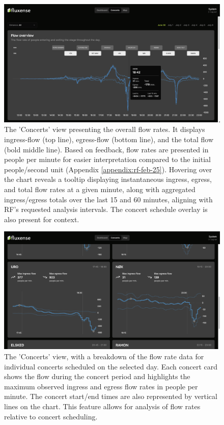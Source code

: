 \begin{figure}[H]
  \centering
  \includegraphics[width=\textwidth]{Pictures/Misc/Frontend/flow_total.png}
  \caption{The 'Concerts' view presenting the overall flow rates. It displays ingress-flow (top line), egress-flow (bottom line), and the total flow (bold middle line). Based on feedback, flow rates are presented in people per minute for easier interpretation compared to the initial people/second unit (Appendix \ref{appendix:rf-feb-25}). Hovering over the chart reveals a tooltip displaying instantaneous ingress, egress, and total flow rates at a given minute, along with aggregated ingress/egress totals over the last 15 and 60 minutes, aligning with RF's requested analysis intervals. The concert schedule overlay is also present for context.}
  \label{fig:showcase:flow-total}

\end{figure}

\begin{figure}[H]
  \centering
  \includegraphics[width=\textwidth]{Pictures/Misc/Frontend/flow_concerts.png}
  \caption{The 'Concerts' view, with a breakdown of the flow rate data for individual concerts scheduled on the selected day. Each concert card shows the flow during the concert period and highlights the maximum observed ingress and egress flow rates in people per minute. The concert start/end times are also represented by vertical lines on the chart. This feature allows for analysis of flow rates relative to concert scheduling.}
  \label{fig:showcase:concerts}

\end{figure}

